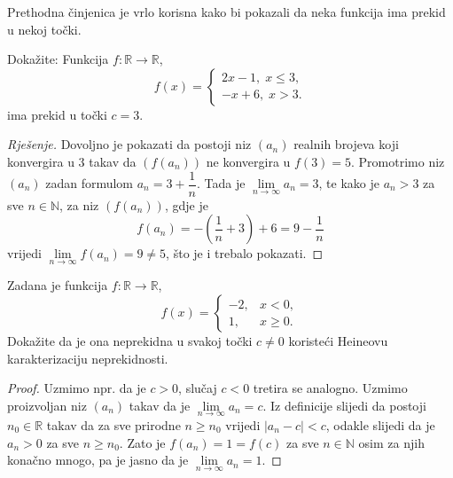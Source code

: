Prethodna činjenica je vrlo korisna kako bi pokazali da neka funkcija ima prekid u nekoj točki.
\begin{exercise} Dokažite: Funkcija $f : \mathbb{R}\to \mathbb{R}$, $$f(x)=\begin{cases}
2x-1,\; x\leq 3,\\
-x+6,\; x>3.
\end{cases}$$
ima prekid u točki $c=3$.
\end{exercise}
\begin{proof}[Rješenje]
Dovoljno je pokazati da postoji niz $(a_n)$ realnih brojeva koji konvergira u $3$ takav da $\left(f(a_n)\right)$ ne konvergira u $f(3)=5$. Promotrimo niz $(a_n)$ zadan formulom $a_n=3+\dfrac{1}{n}$. Tada je $\lim\limits_{n\to \infty}{a_n}=3$, te kako je $a_n>3$ za sve $n\in \mathbb{N}$, za niz $\left(f(a_n)\right)$, gdje je
$$f(a_n)=-\left(\dfrac{1}{n}+3\right)+6=9-\dfrac{1}{n}$$
vrijedi $\lim\limits_{n\to \infty}{f(a_n)}=9\neq 5$, što je i trebalo pokazati.
\end{proof}
\begin{exercise}
Zadana je funkcija $f : \mathbb{R}\to \mathbb{R}$,
$$f(x)=\begin{cases}
-2, & x<0,\\
1, & x\geq 0.
\end{cases}$$
Dokažite da je ona neprekidna u svakoj točki $c\neq 0$ koristeći Heineovu karakterizaciju neprekidnosti.
\end{exercise}
\begin{proof}
Uzmimo npr. da je $c>0$, slučaj $c<0$ tretira se analogno. Uzmimo proizvoljan niz $(a_n)$ takav da je $\lim\limits_{n\to \infty}{a_n}=c$. Iz definicije slijedi da postoji $n_0\in \mathbb{R}$ takav da za sve prirodne $n\geq n_0$ vrijedi $|a_n-c|<c$, odakle slijedi da je $a_n>0$ za sve $n\geq n_0$. Zato je $f(a_n)=1=f(c)$ za sve $n\in \mathbb{N}$ osim za njih konačno mnogo, pa je jasno da je $\lim\limits_{n\to \infty}{a_n}=1$.
\end{proof}

